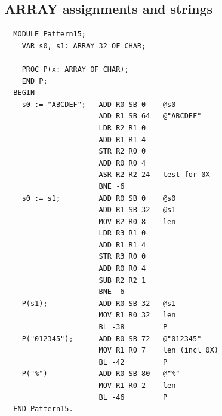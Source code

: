 \subsection{ARRAY assignments and strings}
\begin{verbatim}
  MODULE Pattern15;
    VAR s0, s1: ARRAY 32 OF CHAR;
  
    PROC P(x: ARRAY OF CHAR);
    END P;
  BEGIN
    s0 := "ABCDEF";   ADD R0 SB 0    @s0
                      ADD R1 SB 64   @"ABCDEF"
                      LDR R2 R1 0    
                      ADD R1 R1 4    
                      STR R2 R0 0    
                      ADD R0 R0 4    
                      ASR R2 R2 24   test for 0X
                      BNE -6         
    s0 := s1;         ADD R0 SB 0    @s0
                      ADD R1 SB 32   @s1
                      MOV R2 R0 8    len
                      LDR R3 R1 0    
                      ADD R1 R1 4    
                      STR R3 R0 0    
                      ADD R0 R0 4    
                      SUB R2 R2 1    
                      BNE -6         
    P(s1);            ADD R0 SB 32   @s1
                      MOV R1 R0 32   len
                      BL -38         P
    P("012345");      ADD R0 SB 72   @"012345"
                      MOV R1 R0 7    len (incl 0X)
                      BL -42         P
    P("%")            ADD R0 SB 80   @"%"
                      MOV R1 R0 2    len
                      BL -46         P
  END Pattern15.
\end{verbatim}

